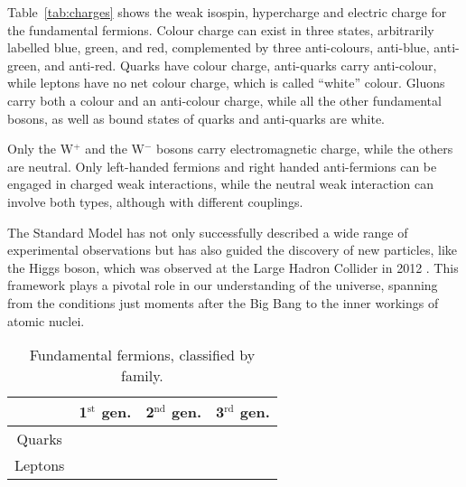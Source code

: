 Table~\ref{tab:charges} shows the weak isospin, hypercharge and electric charge for the fundamental fermions.
Colour charge can exist in three states, arbitrarily labelled blue, green, and red, complemented by three anti-colours, anti-blue, anti-green, and anti-red.
Quarks have colour charge, anti-quarks carry anti-colour, while leptons have no net colour charge, which is called ``white'' colour.
Gluons carry both a colour and an anti-colour charge, while all the other fundamental bosons, as well as bound states of quarks and anti-quarks are white.

Only the W$^+$ and the W$^-$ bosons carry electromagnetic charge, while the others are neutral.
Only left-handed fermions and right handed anti-fermions can be engaged in charged weak interactions, while the neutral weak interaction can involve both types, although with different couplings.

The Standard Model has not only successfully described a wide range of experimental observations but has also guided the discovery of new particles, like the Higgs boson, which was observed at the Large Hadron Collider in 2012 \cite{ATLASHiggsDiscovery, CMS-HIG-12-028}.
This framework plays a pivotal role in our understanding of the universe, spanning from the conditions just moments after the Big Bang to the inner workings of atomic nuclei.

\begin{table}[tbh]
	\centering
	\caption{Fundamental fermions, classified by family.}
	\label{tab:fermions}
	\begin{tabular}{ c c c c }
		\toprule
		 & 1$^{\text{st}}$ gen. & 2$^{\text{nd}}$ gen. & 3$^{\text{rd}}$ gen. \\%
		\midrule
		\multirow{2}{*}{Quarks}  & \PQu  & \PQc   & \PQt   \\%
		                         & \PQd  & \PQs   & \PQb   \\%
		\hline
		\multirow{2}{*}{Leptons} & \PGne & \PGnGm & \PGnGt \\%
		                         & \Pem  & \PGmm  & \PGtm  \\%
		\bottomrule
	\end{tabular}
\end{table}

